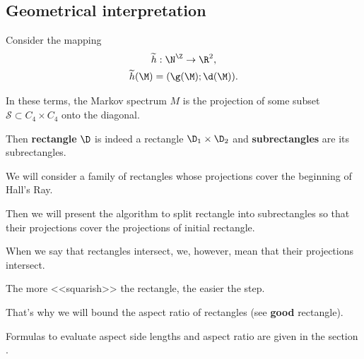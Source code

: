 \subsection{Geometrical interpretation}

Consider the mapping 
\begin{gather*}
	\widetilde{h}: \N^\Z \rightarrow \R^2,\\
	\widetilde{h}(\M) = (\g(\M); \d(\M)).
\end{gather*}

In these terms,
the Markov spectrum $M$
is the projection of some subset $\mathcal{S} \subset C_4 \times C_4$ onto the diagonal.

Then \textbf{rectangle} $\D$ is indeed a rectangle $\D_1 \times \D_2$
and \textbf{subrectangles} are its subrectangles.

We will consider a family of rectangles whose projections cover the beginning of Hall's Ray.

Then we will present the algorithm to split rectangle into subrectangles
so that their projections cover the projections of initial rectangle.

When we say that rectangles intersect, we, however, mean that their projections intersect.

The more <<squarish>> the rectangle, the easier the step.

That's why we will bound the aspect ratio of rectangles (see \textbf{good} rectangle).

Formulas to evaluate aspect side lengths and aspect ratio
are given in the section .
